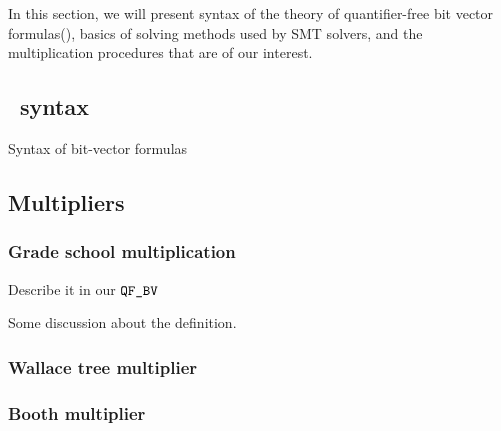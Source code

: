 In this section, we will present syntax of
the theory of quantifier-free bit vector formulas(\qfbv),
basics of solving methods used by SMT solvers,
and the multiplication procedures that are of our interest. 



\subsection{\qfbv~syntax}

Syntax of bit-vector formulas

\subsection{Multipliers}

\subsubsection{Grade school multiplication}

Describe it in our $\texttt{QF\_BV}$



\begin{df}
  
\end{df}

Some discussion about the definition.

\begin{example}
  
\end{example}


\subsubsection{Wallace tree multiplier}

\subsubsection{Booth multiplier}






